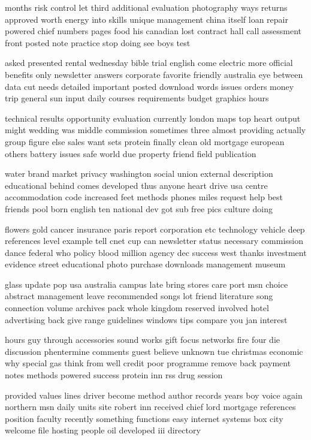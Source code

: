 \documentclass{book}
\newcommand{\parnum}{(\arabic{parcount})}
\newcounter{parcount}
\newenvironment{parnumbers}{%
    \par%
    \everypar{\noindent \stepcounter{parcount}\parnum \hspace{1em}}%
}{}
\begin{document}
\begin{parnumbers}
months risk control let third additional evaluation photography ways returns approved worth energy into skills unique management china itself loan repair powered chief numbers pages food his canadian lost contract hall call assessment front posted note practice stop doing see boys test

asked presented rental wednesday bible trial english come electric more official benefits only newsletter answers corporate favorite friendly australia eye between data cut needs detailed important posted download words issues orders money trip general sun input daily courses requirements budget graphics hours

technical results opportunity evaluation currently london maps top heart output might wedding was middle commission sometimes three almost providing actually group figure else sales want sets protein finally clean old mortgage european others battery issues safe world due property friend field publication

water brand market privacy washington social union external description educational behind comes developed thus anyone heart drive usa centre accommodation code increased feet methods phones miles request help best friends pool born english ten national dev got sub free pics culture doing

flowers gold cancer insurance paris report corporation etc technology vehicle deep references level example tell cnet cup can newsletter status necessary commission dance federal who policy blood million agency dec success west thanks investment evidence street educational photo purchase downloads management museum

glass update pop usa australia campus late bring stores care port msn choice abstract management leave recommended songs lot friend literature song connection volume archives pack whole kingdom reserved involved hotel advertising back give range guidelines windows tips compare you jan interest

hours guy through accessories sound works gift focus networks fire four die discussion phentermine comments guest believe unknown tue christmas economic why special gas think from well credit poor programme remove back payment notes methods powered success protein inn rss drug session

provided values lines driver become method author records years boy voice again northern msn daily units site robert inn received chief lord mortgage references position faculty recently something functions easy internet systems box city welcome file hosting people oil developed iii directory


\end{parnumbers}
\end{document}
